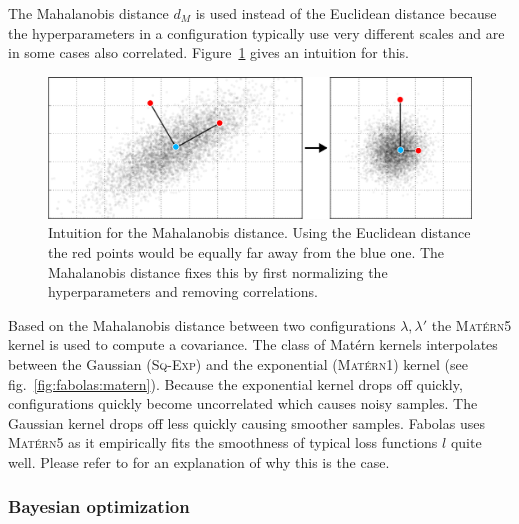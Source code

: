 The Mahalanobis distance \(d_M\) is used instead of the Euclidean distance because the hyperparameters in a configuration typically use very different scales and are in some cases also correlated.
Figure~\ref{fig:fabolas:mahalanobis} gives an intuition for this.
\begin{figure}[t]
	\centering
	\includegraphics[width=0.7\linewidth]{gfx/fabolas/mahalanobisDistance.pdf}
	\caption{
		Intuition for the Mahalanobis distance.
		Using the Euclidean distance the red points would be equally far away from the blue one.
		The Mahalanobis distance fixes this by first normalizing the hyperparameters and removing correlations.
	}\label{fig:fabolas:mahalanobis}
\end{figure}

Based on the Mahalanobis distance between two configurations \(\lambda, \lambda'\) the \textsc{Matérn5} kernel is used to compute a covariance.
The class of Matérn kernels interpolates between the Gaussian (\textsc{Sq-Exp}) and the exponential (\textsc{Matérn1}) kernel (see fig.~\ref{fig:fabolas:matern}).
Because the exponential kernel drops off quickly, configurations quickly become uncorrelated which causes noisy samples.
The Gaussian kernel drops off less quickly causing smoother samples.
Fabolas uses \textsc{Matérn5} as it empirically fits the smoothness of typical loss functions \(l\) quite well.
Please refer to \citet{Schoen2017} for an explanation of why this is the case.

\subsubsection{Bayesian optimization}%
\label{sec:hyperparams:fabolas:bayesian}

